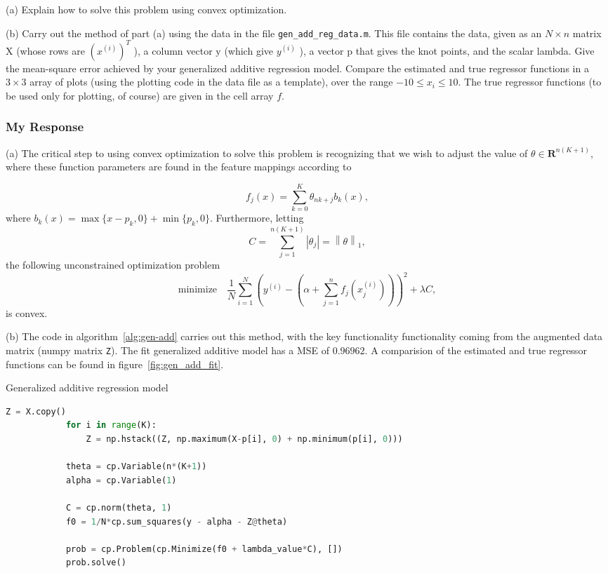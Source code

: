 \documentclass[12pt,reqno]{article}
\theoremstyle{definition}
\numberwithin{equation}{section}
\begin{document}
\vspace{0.1cm}
\noindent (a) Explain how to solve this problem using convex optimization.

\vspace{0.1cm}
\noindent (b) Carry out the method of part (a) using the data in the file \lstinline|gen_add_reg_data.m|. This file contains the data, given as an $N \times n$ matrix $\mathrm{X}$
(whose rows are $\left(x^{(i)}\right)^T$ ), a column vector $\mathrm{y}$ (which give $y^{(i)}$ ), a vector $\mathrm{p}$ that gives the knot points, and the scalar lambda.
Give the mean-square error achieved by your generalized additive regression model.
Compare the estimated and true regressor functions in a $3 \times 3$ array of plots (using the plotting code in the data file as a template), over the range $-10 \leq x_i \leq 10$. The true regressor functions (to be used only for plotting, of course) are given in the cell array $f$.

\subsubsection*{My Response}

\noindent (a) The critical step to using convex optimization to solve this problem is recognizing that
we wish to adjust the value of $\theta \in \mathbf{R}^{n(K+1)}$, where these function parameters 
are found in the feature mappings according to

\[f_{j}(x) = \sum_{k=0}^{K}\theta_{nk + j} b_k(x),\]
where $b_k(x) = \max\{x-p_k, 0\} + \min\{p_k, 0\}$.
Furthermore, letting
\[C = \sum_{j=1}^{n(K+1)} \left| \theta_j \right| = \left\lVert \theta \right\rVert_{1},\]
the following unconstrained optimization problem
\[\mathrm{minimize} \quad \frac{1}{N} \sum_{i=1}^{N}\left(y^{(i)} - (\alpha + \sum_{j=1}^{n}f_j(x_j^{(i)}) ) \right)^2 + \lambda C,\]
is convex.

\noindent (b) The code in algorithm~\ref{alg:gen-add} carries out this method, with the key functionality
functionality coming from the augmented data matrix (numpy matrix \lstinline|Z|). The fit generalized additive
model has a MSE of $0.96962$. A comparision of the estimated and true regressor functions can be found in
figure~\ref{fig:gen_add_fit}.

\begin{algorithm}[htbp]
    \caption{Generalized additive regression model}
    \centering
        \begin{lstlisting}[language=Python]
            Z = X.copy()
            for i in range(K):
                Z = np.hstack((Z, np.maximum(X-p[i], 0) + np.minimum(p[i], 0)))

            theta = cp.Variable(n*(K+1))
            alpha = cp.Variable(1)

            C = cp.norm(theta, 1)
            f0 = 1/N*cp.sum_squares(y - alpha - Z@theta)

            prob = cp.Problem(cp.Minimize(f0 + lambda_value*C), [])
            prob.solve()
        \end{lstlisting}
    \label{alg:gen-add}
\end{algorithm}
\end{document}

